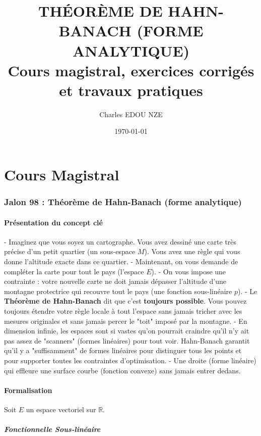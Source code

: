 \documentclass[11pt,a4paper]{article}
\title{\Huge THÉORÈME DE HAHN-BANACH (FORME ANALYTIQUE) \\ \large Cours magistral, exercices corrigés et travaux pratiques}
\author{\Large Charles EDOU NZE}
\date{\today}
\begin{document}
\maketitle
\tableofcontents
\newpage

\part{Cours Magistral}

\section{Jalon 98 : Théorème de Hahn-Banach (forme analytique)}

\subsection{Présentation du concept clé}

- Imaginez que vous soyez un cartographe. Vous avez dessiné une carte très précise d'un petit quartier (un sous-espace $M$). Vous avez une règle qui vous donne l'altitude exacte dans ce quartier.
    - Maintenant, on vous demande de compléter la carte pour tout le pays (l'espace $E$).
    - On vous impose une contrainte : votre nouvelle carte ne doit jamais dépasser l'altitude d'une montagne protectrice qui recouvre tout le pays (une fonction sous-linéaire $p$).
    - Le \textbf{Théorème de Hahn-Banach} dit que c'est \textbf{toujours possible}. Vous pouvez toujours étendre votre règle locale à tout l'espace sans jamais tricher avec les mesures originales et sans jamais percer le "toit" imposé par la montagne.
- En dimension infinie, les espaces sont si vastes qu'on pourrait craindre qu'il n'y ait pas assez de "scanners" (formes linéaires) pour tout voir. Hahn-Banach garantit qu'il y a "suffisamment" de formes linéaires pour distinguer tous les points et pour supporter toutes les contraintes d'optimisation.
- Une droite (forme linéaire) qui effleure une surface courbe (fonction convexe) sans jamais entrer dedans.

\subsection{Formalisation}

Soit $E$ un espace vectoriel sur $\mathbb{R}$.

\subsubsection{Fonctionnelle Sous-linéaire}
\end{document}
